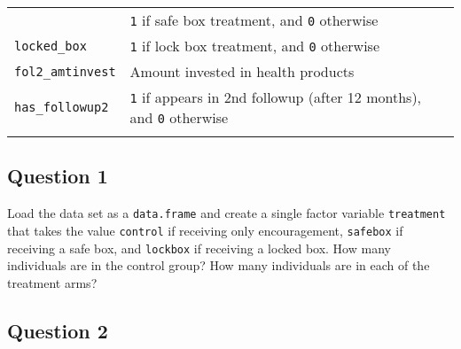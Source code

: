 \documentclass[]{article}
\begin{document}
\begin{longtable}[c]{@{}ll@{}}
\begin{minipage}[t]{0.34\columnwidth}
\end{minipage} & \begin{minipage}[t]{0.59\columnwidth}\raggedright
\texttt{1} if safe box treatment, and \texttt{0} otherwise
\end{minipage}
\\\addlinespace
\begin{minipage}[t]{0.34\columnwidth}\raggedright
\texttt{locked\_box}
\end{minipage} & \begin{minipage}[t]{0.59\columnwidth}\raggedright
\texttt{1} if lock box treatment, and \texttt{0} otherwise
\end{minipage}
\\\addlinespace
\begin{minipage}[t]{0.34\columnwidth}\raggedright
\texttt{fol2\_amtinvest}
\end{minipage} & \begin{minipage}[t]{0.59\columnwidth}\raggedright
Amount invested in health products
\end{minipage}
\\\addlinespace
\begin{minipage}[t]{0.34\columnwidth}\raggedright
\texttt{has\_followup2}
\end{minipage} & \begin{minipage}[t]{0.59\columnwidth}\raggedright
\texttt{1} if appears in 2nd followup (after 12 months), and \texttt{0}
otherwise
\end{minipage}
\\\addlinespace
\bottomrule
\end{longtable}

\subsection{Question 1}\label{question-1}

Load the data set as a \texttt{data.frame} and create a single factor
variable \texttt{treatment} that takes the value \texttt{control} if
receiving only encouragement, \texttt{safebox} if receiving a safe box,
and \texttt{lockbox} if receiving a locked box. How many individuals are
in the control group? How many individuals are in each of the treatment
arms?

\subsection{Question 2}\label{question-2}
\end{document}
